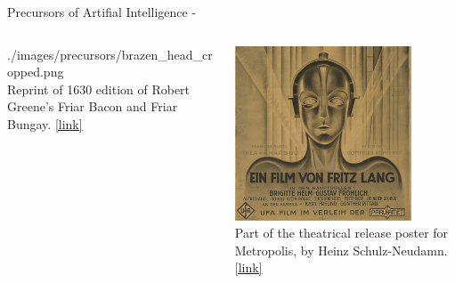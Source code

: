 \begin{frame}[t, allowframebreaks]{Precursors of Artifial Intelligence -}
\begin{columns}[t]
\begin{column}{0.37\textwidth}
\begin{center}
                {./images/precursors/brazen_head_cropped.png}\\
                {\scriptsize 
                \vspace{0.1cm}
                Reprint of 1630 edition of 
                Robert Greene's Friar Bacon and Friar Bungay.
                \href{https://en.wikipedia.org/wiki/Friar_Bacon_and_Friar_Bungay\#/media/File:Greene_Bacon_and_Bungay_1630.jpg}{\tiny [link]}\\
                }
            \end{center}
        \end{column}
        \begin{column}{0.30\textwidth}
            \begin{center}
                \includegraphics[width=0.80\textwidth]
                {./images/precursors/metropolis_cropped.png}\\
                {\scriptsize 
                \vspace{0.1cm}
                Part of the theatrical release poster for Metropolis,
                by Heinz Schulz-Neudamn.
                \href{https://en.wikipedia.org/wiki/Metropolis_(1927_film)\#/media/File:Metropolis_(German_three-sheet_poster).jpg}{\tiny [link]}\\
                }      
            \end{center}
        \end{column}
    \end{columns}

\end{frame}